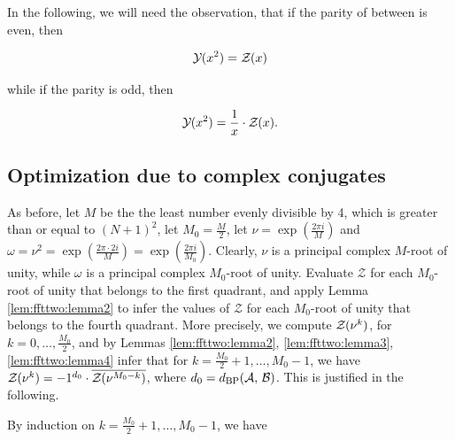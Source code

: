 \documentclass[11pt, oneside]{Thesis} %
\begin{document}
In the following, we will need the observation, that if the parity of
\bpd \dBP{\strA}{\strB} between \strAB is
even, then

\begin{align}
\label{eq:ffttwo:evenY}
\emYof{}{x^2} = \fullZx
\end{align}

while if the parity is odd, then

\begin{align}
\label{eq:ffttwo:oddY}
\emYof{}{x^2} = \frac{1}{x} \cdot \fullZx.
\end{align}

\subsection{Optimization due to complex conjugates}
\label{subsec:ffttwo:compconj}

As before, let $M$ be the the least number evenly divisible by 4, which is
greater than or equal to $(N+1)^2$, let $M_0=\frac{M}{2}$, let $\nu = \exp(\frac{2 \pi i}{M})$
and $\omega=\nu^2 = \exp(\frac{2 \pi \cdot 2i}{M}) =
\exp(\frac{2 \pi i}{M_0})$. Clearly, $\nu$ is a principal complex
$M$-root of unity, while $\omega$ is a principal complex $M_0$-root
of unity. Evaluate $\mathcal Z$ for each $M_0$-root of unity
that belongs to the first quadrant, and apply Lemma \ref{lem:ffttwo:lemma2}
 to infer the values
of $\mathcal Z$ for each $M_0$-root of unity that belongs to the
fourth quadrant. More precisely,
we compute ${\mathcal Z}_{}(\nu^k)$, for $k=0,\dots,\frac{M_0}{2}$, and by Lemmas
\ref{lem:ffttwo:lemma2}, \ref{lem:ffttwo:lemma3}, \ref{lem:ffttwo:lemma4} infer
that for $k=\frac{M_0}{2}+1,\dots,M_0-1$, we have
${\mathcal Z}_{}(\nu^{k})= -1^{d_0} \cdot \overline{{\mathcal Z}_{}(\nu^{M_0-k})}$,
where
$d_0 = d_{\text{BP}}(\mathcal A,\,\mathcal B)$. This is justified in the following.

By induction on $k=\frac{M_0}{2}+1,\dots,M_0-1$, we have

\newlength{\maxLengthCases}
\end{document}
